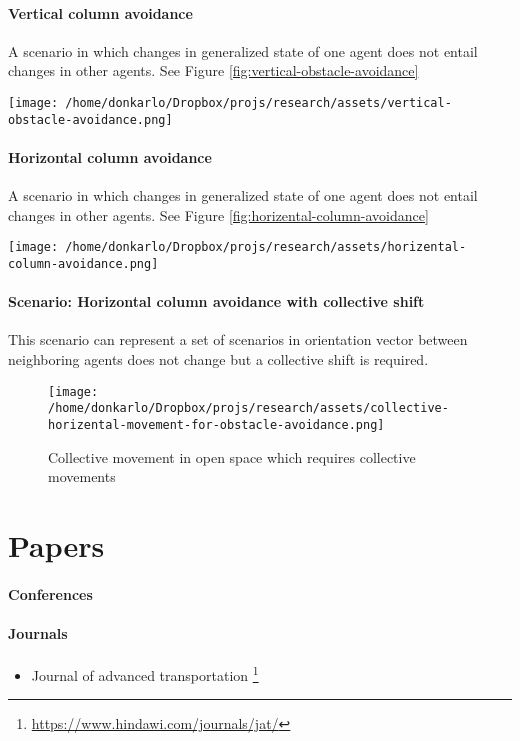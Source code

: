 \documentclass{article}
\begin{document}
				\paragraph{Vertical column avoidance}
					A scenario in which changes in generalized state of one agent does not entail changes in other agents. See Figure \ref{fig:vertical-obstacle-avoidance}
					\begin{figure*}
						\centering
						\texttt{[image: /home/donkarlo/Dropbox/projs/research/assets/vertical-obstacle-avoidance.png]}
						\caption{Vertical obstacle avoidance}
						\label{fig:vertical-obstacle-avoidance}
					\end{figure*}
				\paragraph{Horizontal column avoidance}
					A scenario in which changes in generalized state of one agent does not entail changes in other agents. See Figure \ref{fig:horizental-column-avoidance}
					\begin{figure*}
						\centering
						\texttt{[image: /home/donkarlo/Dropbox/projs/research/assets/horizental-column-avoidance.png]}
						\caption{A scenario similar to Figure \ref{fig:vertical-obstacle-avoidance} from which collective behavior could be learned}
						\label{fig:horizental-column-avoidance}
					\end{figure*}
				
				\paragraph{Scenario: Horizontal column avoidance with collective shift}
					This scenario can represent a set of scenarios in orientation vector between neighboring agents does not change but a collective shift is required.
					\begin{figure}
						\centering
						\texttt{[image: /home/donkarlo/Dropbox/projs/research/assets/collective-horizental-movement-for-obstacle-avoidance.png]}
						\label{fig:scenario}
						\caption{Collective movement in open space which requires collective movements}
					\end{figure}   
	
	\section{Papers}
		\paragraph{Conferences}
		\paragraph{Journals}
			\begin{itemize}
				\item Journal of advanced transportation \footnote{\url{https://www.hindawi.com/journals/jat/}} 
			\end{itemize}
	
\end{document}
